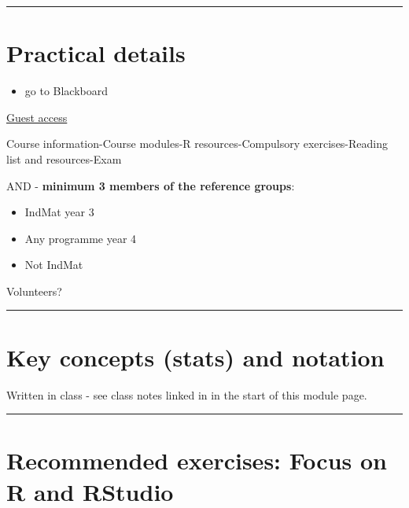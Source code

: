 \documentclass[]{article}
\providecommand{\tightlist}{%
  \setlength{\itemsep}{0pt}\setlength{\parskip}{0pt}}
\begin{document}
\begin{center}\rule{0.5\linewidth}{\linethickness}\end{center}

\hypertarget{practical-details}{%
\section{Practical details}\label{practical-details}}

\begin{itemize}
\tightlist
\item
  go to Blackboard
\end{itemize}

\href{https://ntnu.blackboard.com/webapps/blackboard/execute/modulepage/view?course_id=_7960_1\&cmp_tab_id=_40192_1\&mode=view}{Guest
access}

Course information-Course modules-R resources-Compulsory
exercises-Reading list and resources-Exam

AND - \textbf{minimum 3 members of the reference groups}:

\begin{itemize}
\tightlist
\item
  IndMat year 3
\item
  Any programme year 4
\item
  Not IndMat
\end{itemize}

Volunteers?

\begin{center}\rule{0.5\linewidth}{\linethickness}\end{center}

\hypertarget{key-concepts-stats-and-notation}{%
\section{Key concepts (stats) and
notation}\label{key-concepts-stats-and-notation}}

Written in class - see class notes linked in in the start of this module
page.

\begin{center}\rule{0.5\linewidth}{\linethickness}\end{center}

\hypertarget{recommended-exercises-focus-on-r-and-rstudio}{%
\section{Recommended exercises: Focus on R and
RStudio}\label{recommended-exercises-focus-on-r-and-rstudio}}
\end{document}
